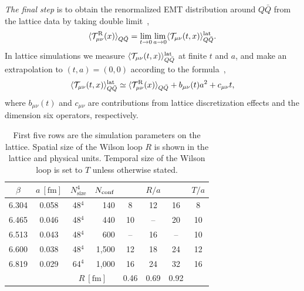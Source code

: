 \documentclass[3p,twocolumn,sort&compress]{elsarticle}
\begin{document}
{\it The final step} is to obtain the renormalized  EMT distribution  around
${Q\bar{Q}} $ from the lattice data by taking double limit~\cite{Asakawa:2013laa,Kitazawa:2016dsl},
 \begin{eqnarray}
 \langle {\cal T}^{\rm R}_{\mu\nu}(x)\rangle_{Q\bar{Q}}
  = \lim_{t \rightarrow 0}  \lim_{a \rightarrow 0}
  \langle {\cal T}_{\mu\nu}(t,x)\rangle_{Q\bar{Q}}^{\rm lat}.
\label{eq:limits}
\end{eqnarray}
In lattice simulations we measure
$\langle {\cal T}_{\mu\nu}(t,x)\rangle_{Q\bar{Q}}^{\rm lat}$ at finite $t$ and $a$, and 
make an extrapolation to $(t,a)=(0,0)$ according to the formula~\cite{Kitazawa:2016dsl,Kitazawa:2017qab},
\begin{align}
\langle {\cal T}_{\mu\nu}(t,x)\rangle_{Q\bar{Q}}^{\rm lat}
\simeq  \langle {\cal T}^{\rm R}_{\mu\nu}(x)\rangle_{Q\bar{Q}} + b_{\mu
\nu}(t){a^2} + c_{\mu \nu} t,
\label{eq:ansatz}
\end{align}
where $b_{\mu \nu}(t)$ and $c_{\mu \nu} $ are contributions from
lattice discretization effects and the dimension six
operators, respectively.

\begin{table}
 \centering
 \caption{
   First five rows are the simulation parameters on the lattice.
   Spatial size of the Wilson loop $R$ 
     is shown in the lattice and physical units.
   Temporal size of the Wilson loop is set to $T$
     unless otherwise stated.
 }
\begin{tabular}{|cccr|ccc|c|}
 \hline
 $\beta$ & $a~[\mathrm{fm}]$ & $N_\mathrm{size}^4$ & $N_{\rm conf}$
 &    & $R/{a}$  &  & $T/{a}$     \\
 \hline
 6.304 & 0.058 & 48$^4$ & 140   & 8  & 12 & 16 & 8    \\
 6.465 & 0.046 & 48$^4$ & 440    & 10 & -- & 20 & 10 \\
 6.513 & 0.043 & 48$^4$ & 600    & -- & 16 & -- & 10 \\
 6.600 & 0.038 & 48$^4$ & 1,500  & 12 & 18 & 24 & 12 \\
 6.819 & 0.029 & 64$^4$ & 1,000 & 16 & 24 & 32 & 16   \\
 \hline

   & & \multicolumn{2}{c|}{$R ~[\mathrm{fm}]$}  &   0.46 & 0.69  & 0.92 &    \\
 \hline
 \end{tabular}
 \label{table:param}
\end{table}
\end{document}
